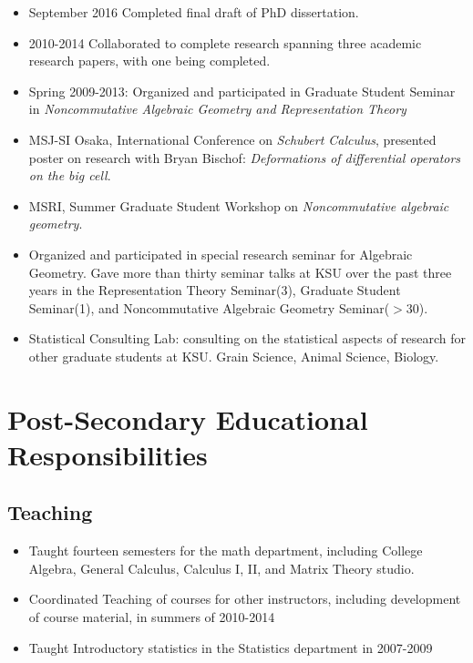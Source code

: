 \documentclass[a4paper,10pt,notitlepage]{article}
\begin{document}
	\begin{itemize}

	\vspace{-5pt}\item September 2016 Completed final draft of PhD dissertation. 
	\vspace{-5pt}\item 2010-2014 Collaborated to complete research spanning three academic research papers, with one being completed. 	

	\vspace{-5pt}\item Spring 2009-2013: Organized and participated in Graduate Student Seminar in \textit{Noncommutative Algebraic Geometry and Representation Theory} 

	\vspace{-5pt}\item	MSJ-SI Osaka, International Conference on \emph{Schubert Calculus}, presented poster on research with Bryan Bischof: \emph{Deformations of differential operators on the big cell}.

	\vspace{-5pt}\item	MSRI, Summer Graduate Student Workshop on \emph{Noncommutative algebraic geometry}.

	
	\vspace{-5pt}\item 	Organized and participated in special research seminar for Algebraic Geometry. Gave more than thirty seminar talks at KSU over the past three years in the Representation Theory Seminar(3), Graduate Student Seminar(1), and Noncommutative Algebraic Geometry Seminar($>30$).

	\vspace{-5pt}\item 	Statistical Consulting Lab: consulting on the statistical aspects of research for other graduate students at KSU. Grain Science, Animal Science, Biology.
	\end{itemize}


	\vspace{-10pt}\section*{Post-Secondary Educational Responsibilities}
	\vspace{-7pt}\subsection*{Teaching} \begin{itemize} \vspace{-5pt}\item Taught fourteen semesters for the math department, including College Algebra, General Calculus, Calculus I, II, and Matrix Theory studio. \vspace{-5pt}\item Coordinated Teaching of courses for other instructors, including development of course material, in summers of 2010-2014 \item Taught Introductory statistics in the Statistics department in 2007-2009 \end{itemize}
	
\end{document}
